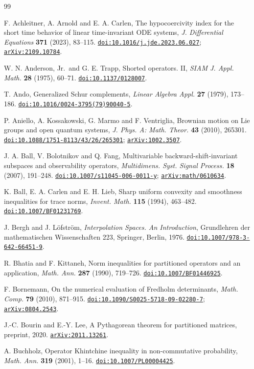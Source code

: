 \documentclass[11pt,a4paper]{amsart}
\numberwithin{equation}{section}
\theoremstyle{definition}
\theoremstyle{remark}
\newcommand{\arxiv}[1]{\href{https://arxiv.org/abs/#1}{\nolinkurl{arXiv:#1}}}
\newcommand{\doi}[1]{\href{https://doi.org/#1}{\nolinkurl{doi:#1}}}
\begin{document}
\begin{thebibliography}{99}
\small\raggedright
\setlength{\itemsep}{2pt}

 F. Achleitner, A. Arnold and E. A. Carlen,
The hypocoercivity index for the short time behavior of linear time-invariant ODE systems,
\emph{J. Differential Equations} \textbf{371} (2023), 83--115.
\doi{10.1016/j.jde.2023.06.027}; \arxiv{2109.10784}.

 W. N. Anderson, Jr.\ and G. E. Trapp,
Shorted operators. II, \emph{SIAM J. Appl. Math.} \textbf{28} (1975), 60--71. \doi{10.1137/0128007}.

 T. Ando, Generalized Schur complements,
\emph{Linear Algebra Appl.} \textbf{27} (1979), 173--186. \doi{10.1016/0024-3795(79)90040-5}.

 P. Aniello, A. Kossakowski, G. Marmo and F. Ventriglia,
Brownian motion on Lie groups and open quantum systems,
\emph{J. Phys. A: Math. Theor.} \textbf{43} (2010), 265301.
\doi{10.1088/1751-8113/43/26/265301}; \arxiv{1002.3507}.

 J. A. Ball, V. Bolotnikov and Q. Fang,
Multivariable backward-shift-invariant subspaces and observability operators,
\emph{Multidimens. Syst. Signal Process.} \textbf{18} (2007), 191--248.
\doi{10.1007/s11045-006-0011-y}; \arxiv{math/0610634}.

 K. Ball, E. A. Carlen and E. H. Lieb,
Sharp uniform convexity and smoothness inequalities for trace norms,
\emph{Invent. Math.} \textbf{115} (1994), 463--482. \doi{10.1007/BF01231769}.

 J. Bergh and J. L\"ofstr\"om, \emph{Interpolation Spaces. An Introduction},
Grundlehren der mathematischen Wissenschaften 223, Springer, Berlin, 1976. \doi{10.1007/978-3-642-66451-9}.

 R. Bhatia and F. Kittaneh, Norm inequalities for partitioned operators and an application,
\emph{Math. Ann.} \textbf{287} (1990), 719--726. \doi{10.1007/BF01446925}.

 F. Bornemann, On the numerical evaluation of Fredholm determinants,
\emph{Math. Comp.} \textbf{79} (2010), 871--915. \doi{10.1090/S0025-5718-09-02280-7}; \arxiv{0804.2543}.

 J.-C. Bourin and E.-Y. Lee,
A Pythagorean theorem for partitioned matrices,
preprint, 2020. \arxiv{2011.13261}.

 A. Buchholz, Operator Khintchine inequality in non-commutative probability,
\emph{Math. Ann.} \textbf{319} (2001), 1--16. \doi{10.1007/PL00004425}.


\end{thebibliography}
\end{document}
